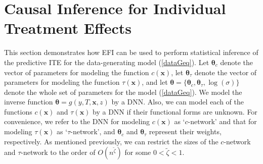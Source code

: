 \documentclass[11pt]{article}
\newcommand{\bX}{{\boldsymbol X}}
\newcommand{\bY}{{\boldsymbol Y}}
\newcommand{\bx}{{\boldsymbol x}}
\newcommand{\bZ}{{\boldsymbol Z}}
\newcommand{\bw}{{\boldsymbol w}}
\newcommand{\bbeta}{{\boldsymbol \beta}}
\newcommand{\btheta}{{\boldsymbol \theta}}
\newtheorem{remark}{Remark}
\begin{document}











\section{Causal Inference for Individual Treatment Effects} 

This section demonstrates how EFI can be used to perform statistical inference of 
the predictive ITE for the data-generating model (\ref{dataGeq}). 
Let $\btheta_c$ denote the vector of parameters for modeling the function $c(\bx)$, 
let $\btheta_{\tau}$ denote the vector of parameters for modeling the function 
$\tau(\bx)$, and let $\btheta=\{\btheta_c,\btheta_{\tau},\log(\sigma)\}$ denote the whole set of parameters for the model (\ref{dataGeq}). 
We model the inverse function $\btheta=g(y,T,\bx,z)$ 
by a DNN. Also, we can model each of the functions  
$c(\bx)$ and $\tau(\bx)$ by a DNN if their functional forms 
are unknown. For convenience, we refer to the DNN for modeling $c(\bx)$ as `$c$-network' 
and that for modeling $\tau(\bx)$ as `$\tau$-network', and  $\btheta_c$ and $\btheta_{\tau}$ represent their weights, respectively.  
As mentioned previously, we can restrict the sizes of the $c$-network and $\tau$-network
to the order of $O(n^{\tilde{\zeta}})$ for some $0<\tilde{\zeta}<1$.
\end{document}
